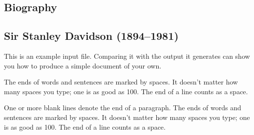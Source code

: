\begin{frontmatter}
\chapter*{Biography}
\end{frontmatter}

\begin{biography}

  \section*{Sir Stanley Davidson (1894--1981)}

  This is an example input file.  Comparing it with the output it
  generates can show you how to produce a simple document of your own.

  The ends of words and sentences are marked by spaces. It doesn't
  matter how many spaces you type; one is as good as 100.  The end of
  a line counts as a space.

  One or more blank lines denote the end of a paragraph.  The ends of
  words and sentences are marked by spaces. It doesn't matter how many
  spaces you type; one is as good as 100.  The end of a line counts as
  a space.
\end{biography}
